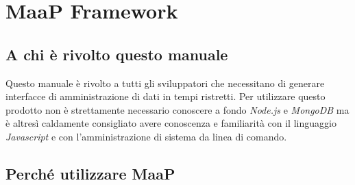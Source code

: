 \section{MaaP Framework}

\subsection{A chi è rivolto questo manuale}

Questo manuale è rivolto a tutti gli sviluppatori che necessitano di generare interfacce di amministrazione di dati in tempi ristretti. Per utilizzare questo prodotto non è strettamente necessario conoscere a fondo \textit{Node.js} e \textit{MongoDB} ma è altresì caldamente consigliato avere conoscenza e familiarità con il linguaggio \textit{Javascript} e con l'amministrazione di sistema da linea di comando.

\subsection{Perché utilizzare MaaP}


